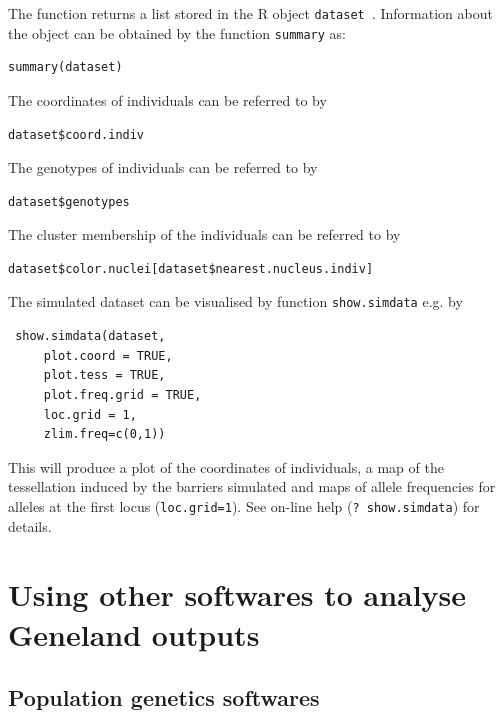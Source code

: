 \documentclass[a4paper,10pt]{article}
\begin{document}
The function returns a list stored in the R object {\tt dataset }.
Information about the object can be obtained by the function {\tt summary} as:

\begin{verbatim}
summary(dataset)
\end{verbatim}



The coordinates of individuals can be referred to by 

\begin{verbatim}
dataset$coord.indiv
\end{verbatim}



The genotypes of individuals can be referred to by 

\begin{verbatim}
dataset$genotypes
\end{verbatim}



The cluster membership of the individuals can be referred to by 

\begin{verbatim}
dataset$color.nuclei[dataset$nearest.nucleus.indiv]
\end{verbatim}





The simulated dataset can be visualised by function {\tt show.simdata} e.g. by

\begin{verbatim}
 show.simdata(dataset,
     plot.coord = TRUE,
     plot.tess = TRUE,
     plot.freq.grid = TRUE,
     loc.grid = 1,
     zlim.freq=c(0,1))
\end{verbatim}



 This will produce a plot of the coordinates of individuals, a map of the tessellation induced by the barriers simulated and 
maps of allele frequencies for alleles at the first locus ({\tt loc.grid=1}). 
See on-line help ({\tt ? show.simdata}) for details.

\clearpage
\section{Using other softwares to analyse {\sc Geneland} outputs}

\subsection{Population genetics softwares}
\end{document}
